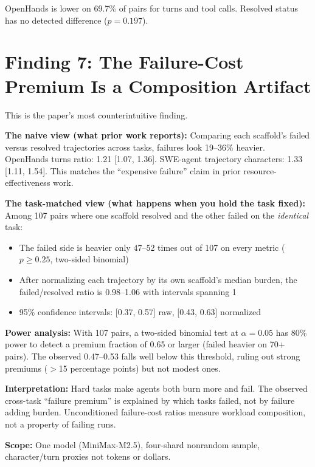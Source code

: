 \documentclass[11pt]{article}
\begin{document}
OpenHands is lower on 69.7\% of pairs for turns and tool calls. Resolved
status has no detected difference ($p = 0.197$).

\section{Finding 7: The Failure-Cost Premium Is a Composition Artifact}

This is the paper's most counterintuitive finding.

\textbf{The naive view (what prior work reports):} Comparing each scaffold's
failed versus resolved trajectories across tasks, failures look 19--36\%
heavier. OpenHands turns ratio: 1.21 [1.07, 1.36]. SWE-agent trajectory
characters: 1.33 [1.11, 1.54]. This matches the ``expensive failure'' claim
in prior resource-effectiveness work.

\textbf{The task-matched view (what happens when you hold the task fixed):}
Among 107 pairs where one scaffold resolved and the other failed on the
\emph{identical} task:

\begin{itemize}[nosep]
\item The failed side is heavier only 47--52 times out of 107 on every metric
  ($p \geq 0.25$, two-sided binomial)
\item After normalizing each trajectory by its own scaffold's median burden,
  the failed/resolved ratio is 0.98--1.06 with intervals spanning 1
\item 95\% confidence intervals: [0.37, 0.57] raw, [0.43, 0.63] normalized
\end{itemize}

\textbf{Power analysis:} With 107 pairs, a two-sided binomial test at
$\alpha = 0.05$ has 80\% power to detect a premium fraction of 0.65 or larger
(failed heavier on 70+ pairs). The observed 0.47--0.53 falls well below this
threshold, ruling out strong premiums ($>$15 percentage points) but not modest
ones.

\textbf{Interpretation:} Hard tasks make agents both burn more and fail. The
observed cross-task ``failure premium'' is explained by which tasks failed, not
by failure adding burden. Unconditioned failure-cost ratios measure workload
composition, not a property of failing runs.

\textbf{Scope:} One model (MiniMax-M2.5), four-shard nonrandom sample,
character/turn proxies not tokens or dollars.
\end{document}
